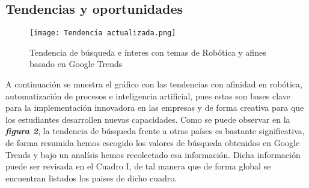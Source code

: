 \documentclass[conference]{IEEEtran}
\begin{document}
\subsection{Tendencias y oportunidades}
\begin{figure}
    \centering
    \texttt{[image: Tendencia actualizada.png]}
    \caption{Tendencia de búsqueda e ínteres  con temas de Robótica y afines basado en Google Trends}
    \label{fig:enter-label}
\end{figure}
A continuación se muestra el gráfico con las tendencias con afinidad en robótica, automatización de procesos e inteligencia artificial, pues estas son bases clave para la implementación innovadora en las empresas y de forma creativa para que los estudiantes desarrollen nuevas capacidades.
Como se puede observar en la \textit{\textbf{figura 2}}, la tendencia de búsqueda frente a otras países es bastante significativa, de forma resumida hemos escogido los valores de búsqueda obtenidos en Google Trends y bajo un analísis hemos recolectado esa información. Dicha información puede ser revisada en el Cuadro I, de tal manera que de forma global se encuentran listados los paises de dicho cuadro.


\end{document}
